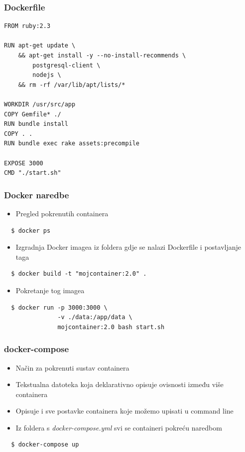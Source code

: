 \documentclass[t]{beamer}
\begin{document}
\begin{frame}[fragile]
	\frametitle{Dockerfile}
  \scriptsize
	\begin{verbatim}
FROM ruby:2.3

RUN apt-get update \
    && apt-get install -y --no-install-recommends \
        postgresql-client \
        nodejs \
    && rm -rf /var/lib/apt/lists/*

WORKDIR /usr/src/app
COPY Gemfile* ./
RUN bundle install
COPY . .
RUN bundle exec rake assets:precompile

EXPOSE 3000
CMD "./start.sh"
	\end{verbatim}
\end{frame}


\begin{frame}[fragile]
	\frametitle{Docker naredbe}

	\begin{itemize}
		\item Pregled pokrenutih containera
	\end{itemize}
  \begin{verbatim}
  $ docker ps
  \end{verbatim}

  \begin{itemize}
    \item Izgradnja Docker imagea iz foldera gdje se nalazi Dockerfile i postavljanje taga
  \end{itemize}
  \begin{verbatim}
  $ docker build -t "mojcontainer:2.0" .
  \end{verbatim}

  \begin{itemize}
    \item Pokretanje tog imagea
  \end{itemize}
  \begin{verbatim}
  $ docker run -p 3000:3000 \
               -v ./data:/app/data \
               mojcontainer:2.0 bash start.sh
  \end{verbatim}

\end{frame}


\begin{frame}[fragile]
	\frametitle{docker-compose}

  \begin{itemize}
    \item Način za pokrenuti sustav containera
    \item Tekstualna datoteka koja deklarativno opisuje ovisnosti između više containera
    \item Opisuje i sve postavke containera koje možemo upisati u command line
  \end{itemize}

  \begin{itemize}
    \item Iz foldera s \textit{docker-compose.yml} svi se containeri pokreću naredbom
  \end{itemize}

  \begin{verbatim}
  $ docker-compose up
  \end{verbatim}

\end{frame}
\end{document}
